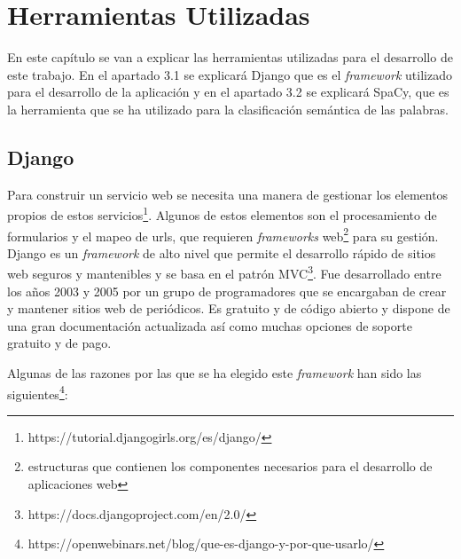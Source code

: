 \chapter{Herramientas Utilizadas}
\label{cap:herramientas}

En este capítulo se van a explicar las herramientas utilizadas para el desarrollo de este trabajo. En el apartado 3.1 se explicará Django que es el \textit{framework} utilizado para el desarrollo de la aplicación y en el apartado 3.2 se explicará SpaCy, que es la herramienta que se ha utilizado para la clasificación semántica de las palabras. 


\section{Django}
\label{cap:sec:django}
Para construir un servicio web se necesita una manera de gestionar los elementos propios de estos servicios\footnote{https://tutorial.djangogirls.org/es/django/}. Algunos de estos elementos son el procesamiento de formularios y el mapeo de urls, que requieren \textit{frameworks} web\footnote{estructuras que contienen los componentes necesarios para el desarrollo de aplicaciones web} para su gestión. 
Django es un \textit{framework} de alto nivel que permite el desarrollo rápido de sitios web seguros y mantenibles y se basa en el patrón MVC\footnote{https://docs.djangoproject.com/en/2.0/}. Fue desarrollado entre los años 2003 y 2005 por un grupo de programadores que se encargaban de crear y mantener sitios web de periódicos. 
Es gratuito y de código abierto y dispone de una gran documentación actualizada así como muchas opciones de soporte gratuito y de pago. 

Algunas de las razones por las que se ha elegido este \textit{framework} han sido las siguientes\footnote{https://openwebinars.net/blog/que-es-django-y-por-que-usarlo/}:

